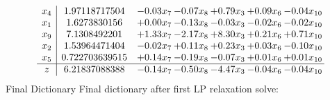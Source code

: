 \documentclass[8pt]{article}
\begin{document}
 \[\begin{array}{c| c c@{\hskip 2pt} c@{\hskip 2pt} c@{\hskip 2pt} c@{\hskip 2pt} c@{\hskip 2pt} }
 x_{4}   &  1.97118717504 & -0.03 x_{7} & -0.07 x_{8} & +  0.79 x_{3} & +  0.09 x_{6} & -0.04 x_{10}\\
 x_{1}   &  1.6273830156 & +  0.00 x_{7} & -0.13 x_{8} & -0.03 x_{3} & -0.02 x_{6} & -0.02 x_{10}\\
 x_{9}   &  7.1308492201 & +  1.33 x_{7} & -2.17 x_{8} & +  8.30 x_{3} & +  0.21 x_{6} & +  0.71 x_{10}\\
 x_{2}   &  1.53964471404 & -0.02 x_{7} & +  0.11 x_{8} & +  0.23 x_{3} & +  0.03 x_{6} & -0.10 x_{10}\\
 x_{5}   &  0.722703639515 & +  0.14 x_{7} & -0.19 x_{8} & -0.07 x_{3} & +  0.01 x_{6} & +  0.01 x_{10}\\
\hline
z    &  6.21837088388 & -0.14 x_{7} & -0.50 x_{8} & -4.47 x_{3} & -0.04 x_{6} & -0.04 x_{10}\\
\end{array}\]
Final Dictionary
Final dictionary after first LP relaxation solve: 
\end{document}
